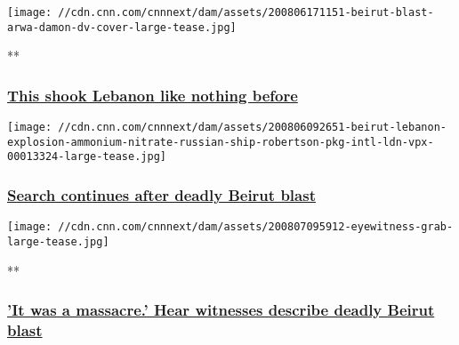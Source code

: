 \href{/videos/world/2020/08/06/beirut-explosion-arwa-damon-lon-orig.cnn}{}

\texttt{[image: //cdn.cnn.com/cnnnext/dam/assets/200806171151-beirut-blast-arwa-damon-dv-cover-large-tease.jpg]}

**

\hypertarget{this-shook-lebanon-like-nothing-before}{%
\subsubsection{\texorpdfstring{\href{/videos/world/2020/08/06/beirut-explosion-arwa-damon-lon-orig.cnn}{This
shook Lebanon like nothing
before}}{This shook Lebanon like nothing before}}\label{this-shook-lebanon-like-nothing-before}}

\href{/middleeast/live-news/beirut-lebanon-explosion-08-06-2020/index.html}{}

\texttt{[image: //cdn.cnn.com/cnnnext/dam/assets/200806092651-beirut-lebanon-explosion-ammonium-nitrate-russian-ship-robertson-pkg-intl-ldn-vpx-00013324-large-tease.jpg]}

\hypertarget{search-continues-after-deadly-beirut-blast-1}{%
\subsubsection{\texorpdfstring{\href{/middleeast/live-news/beirut-lebanon-explosion-08-06-2020/index.html}{Search
continues after deadly Beirut
blast}}{Search continues after deadly Beirut blast}}\label{search-continues-after-deadly-beirut-blast-1}}

\href{/videos/world/2020/08/06/beirut-blast-eyewitness-reaction-lon-orig-na.cnn}{}

\texttt{[image: //cdn.cnn.com/cnnnext/dam/assets/200807095912-eyewitness-grab-large-tease.jpg]}

**

\hypertarget{it-was-a-massacre-hear-witnesses-describe-deadly-beirut-blast}{%
\subsubsection{\texorpdfstring{\href{/videos/world/2020/08/06/beirut-blast-eyewitness-reaction-lon-orig-na.cnn}{'It
was a massacre.' Hear witnesses describe deadly Beirut
blast}}{'It was a massacre.' Hear witnesses describe deadly Beirut blast}}\label{it-was-a-massacre-hear-witnesses-describe-deadly-beirut-blast}}

\href{/2020/08/07/asia/sri-lanka-election-mahinda-rajapaksa-intl-hnk/index.html}{}

